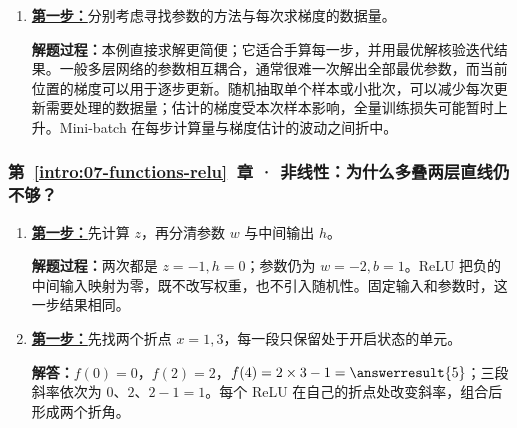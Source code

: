 \begin{enumerate}[label={},leftmargin=4.8em,itemsep=4pt]
\item[\textbf{C-011.}] \leavevmode{}\label{solution:C-011}\label{solution:iterative-method-choice}\hyperref[exercise:iterative-method-choice]{\textbf{第一步：}}分别考虑寻找参数的方法与每次求梯度的数据量。\par\nobreak\textbf{解题过程：}本例直接求解更简便；它适合手算每一步，并用最优解核验迭代结果。一般多层网络的参数相互耦合，通常很难一次解出全部最优参数，而当前位置的梯度可以用于逐步更新。随机抽取单个样本或小批次，可以减少每次更新需要处理的数据量；估计的梯度受本次样本影响，全量训练损失可能暂时上升。Mini-batch 在每步计算量与梯度估计的波动之间折中。
\end{enumerate}
\subsubsection*{第~\ref*{intro:07-functions-relu}~章 · 非线性：为什么多叠两层直线仍不够？}
\begin{enumerate}[label={},leftmargin=4.8em,itemsep=4pt]
\item[\textbf{C-012.}] \leavevmode{}\label{solution:C-012}\label{solution:relu-determinism}\hyperref[exercise:relu-determinism]{\textbf{第一步：}}先计算 $z$，再分清参数 $w$ 与中间输出 $h$。\par\nobreak
\textbf{解题过程：}两次都是 $z=-1,h=0$；参数仍为 $w=-2,b=1$。ReLU 把负的中间输入映射为零，既不改写权重，也不引入随机性。固定输入和参数时，这一步结果相同。
\item[\textbf{C-013.}] \leavevmode{}\label{solution:C-013}\label{solution:relu-piecewise-slopes}\hyperref[exercise:relu-piecewise-slopes]{\textbf{第一步：}}先找两个折点 $x=1,3$，每一段只保留处于开启状态的单元。\par\nobreak
\textbf{解答：}$f(0)=0$，$f(2)=2$，$f(4)=2\times3-1=\answerresult{5}$；三段斜率依次为 $0$、$2$、$2-1=1$。每个 ReLU 在自己的折点处改变斜率，组合后形成两个折角。
\end{enumerate}
